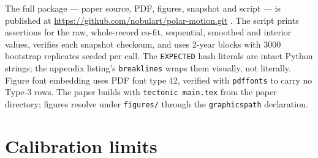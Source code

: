 \documentclass[11pt,a4paper]{article}
\begin{document}
\begin{table}[ht]
\centering
\caption{Dated data snapshot (2026-11-24) and SHA-256 checksums.}
\label{tab:snapshot}
\small
{}
\end{table}

The full package --- paper source, PDF, figures, snapshot and script --- is published at \url{https://github.com/nobulart/polar-motion.git} \cite{repo}. The script prints assertions for the raw, whole-record co-fit, sequential, smoothed and interior values, verifies each snapshot checksum, and uses 2-year blocks with 3000 bootstrap replicates seeded per call. The \texttt{EXPECTED} hash literals are intact Python strings; the appendix listing's \texttt{breaklines} wraps them visually, not literally. Figure font embedding uses PDF font type 42, verified with \texttt{pdffonts} to carry no Type-3 rows. The paper builds with \texttt{tectonic main.tex} from the paper directory; figures resolve under \texttt{figures/} through the \texttt{graphicspath} declaration.

\section{Calibration limits}
\end{document}
